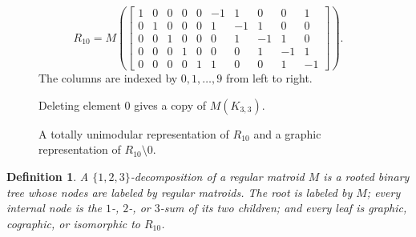 \documentclass[11pt]{article}
\numberwithin{equation}{section}
\newtheorem{definition}{Definition}[section]
\theoremstyle{remark}
\begin{document}
\begin{figure}[t]
\centering
\begin{minipage}[c]{0.60\textwidth}
\centering
\begin{equation}
    R_{10}
    =
    M\!\left(
    \left[
    \begin{array}{ccccc|ccccc}
        1&0&0&0&0&-1& 1& 0& 0& 1\\
        0&1&0&0&0& 1&-1& 1& 0& 0\\
        0&0&1&0&0& 0& 1&-1& 1& 0\\
        0&0&0&1&0& 0& 0& 1&-1& 1\\
        0&0&0&0&1& 1& 0& 0& 1&-1
    \end{array}
    \right]
    \right).
\end{equation}
\small
The columns are indexed by $0,1,\ldots,9$ from left to right.
\end{minipage}
\hfill
\begin{minipage}[c]{0.32\textwidth}
\centering
{}

\small
Deleting element $0$ gives a copy of $M(K_{3,3})$.
\end{minipage}
\caption{A totally unimodular representation of $R_{10}$ and a graphic
representation of $R_{10}\setminus0$.}
\label{fig:r10-k33}
\end{figure}

\begin{definition}
\label{def:seymour-decomposition}
A \emph{$\{1,2,3\}$-decomposition} of a regular matroid $M$ is a rooted
binary tree whose nodes are labeled by regular matroids. The root is labeled
by $M$; every internal node is the $1$-, $2$-, or $3$-sum of its two
children; and every leaf is graphic, cographic, or isomorphic to $R_{10}$.
\end{definition}
\end{document}
